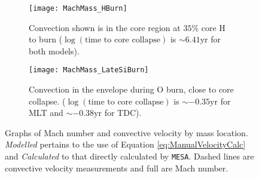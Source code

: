\begin{figure*}[t]
\centering
\begin{subfigure}{0.8\textwidth}
     \texttt{[image: MachMass\_HBurn]}
    \caption{Convection shown is in the core region at $35\%$ core H to burn ($\log \left(\text{time to core collapse}\right)$ is $\sim 6.41\mathrm{yr}$ for both models).}
    \label{fig:MachMass_HBurn}
\end{subfigure}
\hfill
\begin{subfigure}{0.8\textwidth}
    \texttt{[image: MachMass\_LateSiBurn]}
    \caption{Convection in the envelope during O burn, close to core collapse. ($\log \left(\text{time to core collapse}\right)$ is $\sim -0.35\mathrm{yr}$ for \gls{MLT} and $\sim -0.38\mathrm{yr}$ for \gls{TDC}).}
    \label{fig:MachMass_LateSiBurn}
\end{subfigure}
\caption{Graphs of Mach number and convective velocity by mass location. \textit{Modelled} pertains to the use of Equation \ref{eq:ManualVelocityCalc} and \textit{Calculated} to that directly calculated by \texttt{MESA}. Dashed lines are convective velocity measurements and full are Mach number.}
\label{fig:MachVel}
\end{figure*}